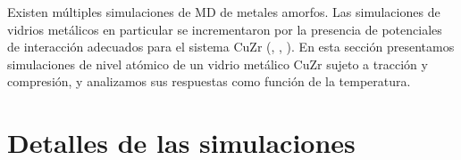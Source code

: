 
Existen múltiples simulaciones de MD de metales amorfos. Las simulaciones de vidrios metálicos en particular se incrementaron por la presencia de potenciales de interacción adecuados para el sistema CuZr (\cite{ogata06}, \cite{arman10}, \cite{guan10}). En esta sección presentamos simulaciones de nivel atómico de un vidrio metálico CuZr sujeto a tracción y compresión, y analizamos sus respuestas como función de la temperatura.


\section{Detalles de las simulaciones}


